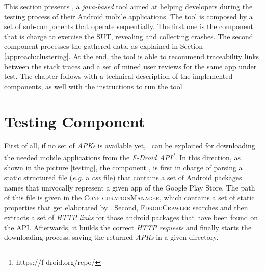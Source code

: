 \label{chapter:tool}
This section presents \toolname, a \textit{java-based} tool aimed at helping  developers during the testing process of their Android mobile applications. The tool is composed by a set of sub-components that operate sequentially. The first one is the component that is charge to exercise the SUT, revealing and collecting crashes. The second component processes the gathered data, as explained in Section \ref{approach:clustering}. At the end, the tool is able to recommend traceability links between the stack traces and a set of mined user reviews for the same app under test. The chapter follows with a technical description of the implemented components, as well with the instructions to run the tool.


\section{Testing Component}
\label{tool: testing}
First of all, if no set of \textit{APKs} is available yet, \toolname\ can be exploited for downloading the needed mobile applications from the \textit{F-Droid API\footnote{https://f-droid.org/repo/}}. In this direction, as shown in the picture \ref{testing}, the component \FDroidCrawler, is first in charge of  parsing a static structured file (\textit{e.g.} a \textit{csv} file) that contains a set of Android packages names that univocally represent a given app of the Google Play Store. 
The path of this file is given in the \textsc{ConfigurationManager}, which contains a set of static properties that get elaborated by \toolname. Second, \textsc{FdroidCrawler} searches and then extracts a set of \textit{HTTP links} for those android packages that have been found on the API. Afterwards, it builds the correct \textit{HTTP requests} and finally starts the downloading process, saving the returned \textit{APKs} in a given directory.

